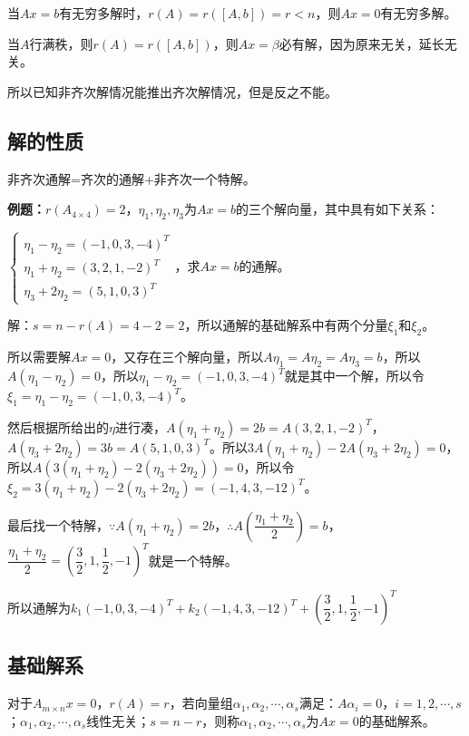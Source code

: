 \documentclass[UTF8, 12pt]{ctexart}
\begin{document}
当$Ax=b$有无穷多解时，$r(A)=r([A,b])=r<n$，则$Ax=0$有无穷多解。

当$A$行满秩，则$r(A)=r([A,b])$，则$Ax=\beta$必有解，因为原来无关，延长无关。

所以已知非齐次解情况能推出齐次解情况，但是反之不能。

\subsection{解的性质}

非齐次通解=齐次的通解+非齐次一个特解。

\textbf{例题：}$r(A_{4\times4})=2$，$\eta_1,\eta_2,\eta_3$为$Ax=b$的三个解向量，其中具有如下关系：

$\left\{\begin{array}{l}
    \eta_1-\eta_2=(-1,0,3,-4)^T \\
    \eta_1+\eta_2=(3,2,1,-2)^T \\
    \eta_3+2\eta_2=(5,1,0,3)^T
\end{array}\right.$，求$Ax=b$的通解。

解：$s=n-r(A)=4-2=2$，所以通解的基础解系中有两个分量$\xi_1$和$\xi_2$。

所以需要解$Ax=0$，又存在三个解向量，所以$A\eta_1=A\eta_2=A\eta_3=b$，所以$A(\eta_1-\eta_2)=0$，所以$\eta_1-\eta_2=(-1,0,3,-4)^T$就是其中一个解，所以令$\xi_1=\eta_1-\eta_2=(-1,0,3,-4)^T$。

然后根据所给出的$\eta$进行凑，$A(\eta_1+\eta_2)=2b=A(3,2,1,-2)^T$，$A(\eta_3+2\eta_2)=3b=A(5,1,0,3)^T$。所以$3A(\eta_1+\eta_2)-2A(\eta_3+2\eta_2)=0$，所以$A(3(\eta_1+\eta_2)-2(\eta_3+2\eta_2))=0$，所以令$\xi_2=3(\eta_1+\eta_2)-2(\eta_3+2\eta_2)=(-1,4,3,-12)^T$。

最后找一个特解，$\because A(\eta_1+\eta_2)=2b$，$\therefore A\left(\dfrac{\eta_1+\eta_2}{2}\right)=b$，$\dfrac{\eta_1+\eta_2}{2}=\left(\dfrac{3}{2},1,\dfrac{1}{2},-1\right)^T$就是一个特解。

所以通解为$k_1(-1,0,3,-4)^T+k_2(-1,4,3,-12)^T+\left(\dfrac{3}{2},1,\dfrac{1}{2},-1\right)^T$

\subsection{基础解系}

对于$A_{m\times n}x=0$，$r(A)=r$，若向量组$\alpha_1,\alpha_2,\cdots,\alpha_s$满足：$A\alpha_i=0$，$i=1,2,\cdots,s$；$\alpha_1,\alpha_2,\cdots,\alpha_s$线性无关；$s=n-r$，则称$\alpha_1,\alpha_2,\cdots,\alpha_s$为$Ax=0$的基础解系。
\end{document}
